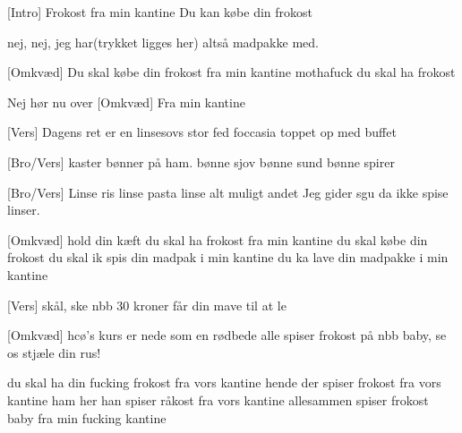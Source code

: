 \documentclass[a4paper,11pt]{article}
\begin{document}
\begin{song}
  [Intro] Frokost
  fra min kantine
  Du kan købe din frokost

   nej, nej, jeg har(trykket ligges her) altså madpakke med.

  [Omkvæd]
  Du skal købe din frokost
  fra min kantine
  mothafuck du skal ha frokost

 Nej hør nu over 
\newpage
  [Omkvæd]
  Fra min kantine

  [Vers]
  Dagens ret
  er en linsesovs
  stor fed foccasia
  toppet op med buffet

  [Bro/Vers] {kaster bønner på ham.}
  bønne sjov
  bønne sund
  bønne spirer


[Bro/Vers] 
Linse ris
linse pasta
linse alt muligt andet 
Jeg gider sgu da ikke spise linser.

[Omkvæd]
hold din kæft du skal ha frokost 
fra min kantine
du skal købe din frokost
du skal ik spis din madpak
i min kantine
du ka lave din madpakke
i min kantine


[Vers]
skål, ske
nbb
30 kroner
får din mave til at le

[Omkvæd]
hcø's kurs er nede
som en rødbede
alle spiser frokost på nbb baby, se os stjæle din rus!

 du skal ha din fucking frokost 
fra vors kantine
hende der spiser frokost 
fra vors kantine
ham her han spiser råkost fra vors kantine
allesammen spiser frokost baby
fra min fucking kantine
\end{song}
\end{document}
